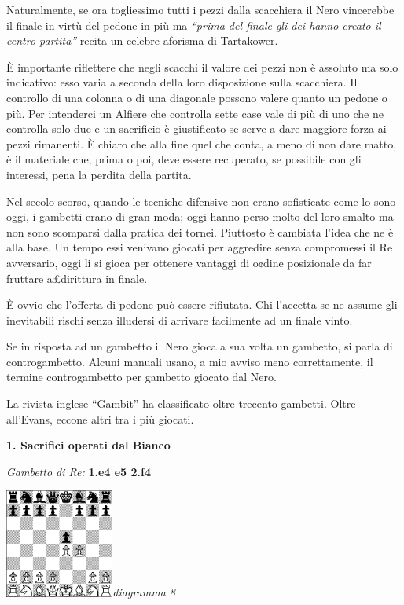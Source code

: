 \documentclass[
]{article}
\begin{document}
Naturalmente, se ora togliessimo tutti i pezzi dalla scacchiera il Nero
vincerebbe il finale in virtù del pedone in più ma \emph{``prima del
finale gli dei hanno creato il centro partita''} recita un celebre
aforisma di Tartakower.

È importante riflettere che negli scacchi il valore dei pezzi non è
assoluto ma solo indicativo: esso varia a seconda della loro
disposizione sulla scacchiera. Il controllo di una colonna o di una
diagonale possono valere quanto un pedone o più. Per intenderci un
Alfiere che controlla sette case vale di più di uno che ne controlla
solo due e un sacrificio è giustificato se serve a dare maggiore forza
ai pezzi rimanenti. È chiaro che alla fine quel che conta, a meno di non
dare matto, è il materiale che, prima o poi, deve essere recuperato, se
possibile con gli interessi, pena la perdita della partita.

Nel secolo scorso, quando le tecniche difensive non erano sofisticate
come lo sono oggi, i gambetti erano di gran moda; oggi hanno perso molto
del loro smalto ma non sono scomparsi dalla pratica dei tornei.
Piuttosto è cambiata l'idea che ne è alla base. Un tempo essi venivano
giocati per aggredire senza compromessi il Re avversario, oggi li si
gioca per ottenere vantaggi di o¢dine posizionale da far fruttare
a£dirittura in finale.

È ovvio che l'offerta di pedone può essere rifiutata. Chi l'accetta se
ne assume gli inevitabili rischi senza illudersi di arrivare facilmente
ad un finale vinto.

Se in risposta ad un gambetto il Nero gioca a sua volta un gambetto, si
parla di controgambetto. Alcuni manuali usano, a mio avviso meno
correttamente, il termine controgambetto per gambetto giocato dal Nero.

La rivista inglese ``Gambit'' ha classificato oltre trecento gambetti.
Oltre all'Evans, eccone altri tra i più giocati.

\textbf{1. Sacrifici operati dal Bianco}

\emph{Gambetto di Re:} \textbf{1.e4 e5 2.f4}

\includegraphics[width=1.40972in,height=1.40972in]{vertopal_109f12be458a423d8f3cc838880eaea2/media/image8.png}\emph{diagramma
8}
\end{document}
